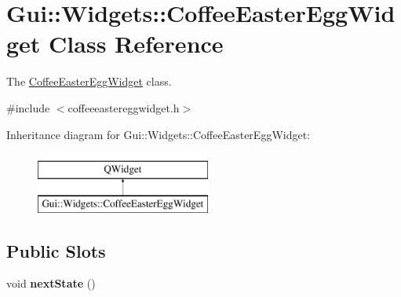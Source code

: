 \hypertarget{classGui_1_1Widgets_1_1CoffeeEasterEggWidget}{\section{Gui\-:\-:Widgets\-:\-:Coffee\-Easter\-Egg\-Widget Class Reference}
\label{classGui_1_1Widgets_1_1CoffeeEasterEggWidget}
}


The \hyperlink{classGui_1_1Widgets_1_1CoffeeEasterEggWidget}{Coffee\-Easter\-Egg\-Widget} class.  




{\ttfamily \#include $<$coffeeeastereggwidget.\-h$>$}

Inheritance diagram for Gui\-:\-:Widgets\-:\-:Coffee\-Easter\-Egg\-Widget\-:\begin{figure}[H]
\begin{center}
\leavevmode
\includegraphics[height=2.000000cm]{dc/ddf/classGui_1_1Widgets_1_1CoffeeEasterEggWidget}
\end{center}
\end{figure}
\subsection*{Public Slots}
\begin{DoxyCompactItemize}
\item 
\hypertarget{classGui_1_1Widgets_1_1CoffeeEasterEggWidget_accaae451a705877710d40fd19723df80}{void {\bfseries next\-State} ()}\label{classGui_1_1Widgets_1_1CoffeeEasterEggWidget_accaae451a705877710d40fd19723df80}

\end{DoxyCompactItemize}
